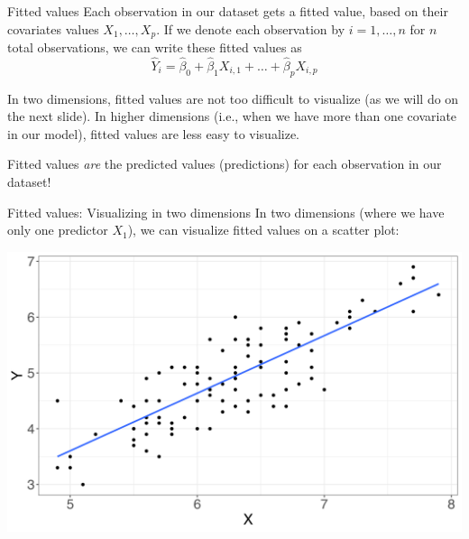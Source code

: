 \documentclass[10pt,t]{beamer}
\begin{document}
\begin{frame}{Fitted values}
Each observation in our dataset gets a fitted value, based on their covariates values $X_1, \dots, X_p$. If we denote each observation by $i = 1, \dots, n$ for $n$ total observations, we can write these fitted values as
$$
\hat{Y}_i = \hat{\beta}_0 + \hat{\beta}_1 X_{i, 1} + \dots + \hat{\beta}_p X_{i, p}
$$

In two dimensions, fitted values are not too difficult to visualize (as we will do on the next slide). In higher dimensions (i.e., when we have more than one covariate in our model), fitted values are less easy to visualize.

\vspace{0.3cm}

Fitted values \textit{are} the predicted values (predictions) for each observation in our dataset!

\end{frame}

\begin{frame}{Fitted values: Visualizing in two dimensions}
In two dimensions (where we have only one predictor $X_1$), we can visualize fitted values on a scatter plot:
\vspace{0.3cm}

\centering \includegraphics[scale=0.4]{figures/fitted_vals1.png}
\end{frame}
\end{document}
